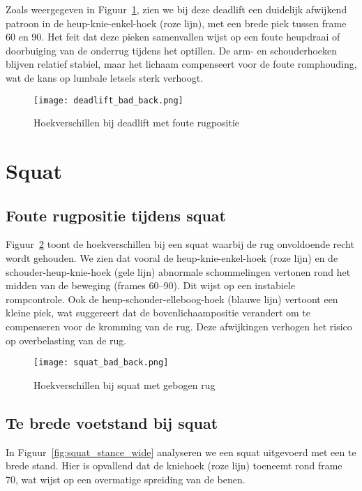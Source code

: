 Zoals weergegeven in Figuur~\ref{fig:deadlift_bad_back}, zien we bij deze deadlift een duidelijk afwijkend patroon in de heup-knie-enkel-hoek (roze lijn), met een brede piek tussen frame 60 en 90. 
Het feit dat deze pieken samenvallen wijst op een foute heupdraai of doorbuiging van de onderrug tijdens het optillen. 
De arm- en schouderhoeken blijven relatief stabiel, maar het lichaam compenseert voor de foute romphouding, wat de kans op lumbale letsels sterk verhoogt.

\begin{figure}[H]
\centering
\texttt{[image: deadlift\_bad\_back.png]}
\caption{Hoekverschillen bij deadlift met foute rugpositie}
\label{fig:deadlift_bad_back}
\end{figure}

\section{Squat}
\subsection{Foute rugpositie tijdens squat}

Figuur~\ref{fig:squat_bad_back} toont de hoekverschillen bij een squat waarbij de rug onvoldoende recht wordt gehouden. 
We zien dat vooral de heup-knie-enkel-hoek (roze lijn) en de schouder-heup-knie-hoek (gele lijn) abnormale schommelingen vertonen rond het midden van de beweging (frames 60–90). 
Dit wijst op een instabiele rompcontrole.
Ook de heup-schouder-elleboog-hoek (blauwe lijn) vertoont een kleine piek, wat suggereert dat de bovenlichaampositie verandert om te compenseren voor de kromming van de rug. 
Deze afwijkingen verhogen het risico op overbelasting van de rug.

\begin{figure}[H]
\centering
\texttt{[image: squat\_bad\_back.png]}
\caption{Hoekverschillen bij squat met gebogen rug}
\label{fig:squat_bad_back}
\end{figure}


\subsection{Te brede voetstand bij squat}

In Figuur~\ref{fig:squat_stance_wide} analyseren we een squat uitgevoerd met een te brede stand. 
Hier is opvallend dat de kniehoek (roze lijn) toeneemt rond frame 70, wat wijst op een overmatige spreiding van de benen. 

